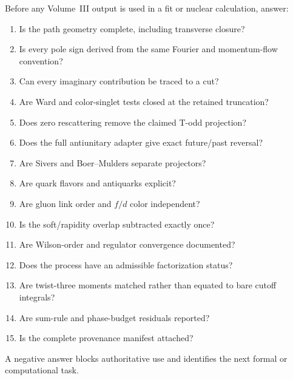 \documentclass[11pt]{article}
\begin{document}
Before any Volume~III output is used in a fit or nuclear calculation, answer:
\begin{enumerate}
\item Is the path geometry complete, including transverse closure?
\item Is every pole sign derived from the same Fourier and momentum-flow
      convention?
\item Can every imaginary contribution be traced to a cut?
\item Are Ward and color-singlet tests closed at the retained truncation?
\item Does zero rescattering remove the claimed T-odd projection?
\item Does the full antiunitary adapter give exact future/past reversal?
\item Are Sivers and Boer--Mulders separate projectors?
\item Are quark flavors and antiquarks explicit?
\item Are gluon link order and \(f/d\) color independent?
\item Is the soft/rapidity overlap subtracted exactly once?
\item Are Wilson-order and regulator convergence documented?
\item Does the process have an admissible factorization status?
\item Are twist-three moments matched rather than equated to bare cutoff
      integrals?
\item Are sum-rule and phase-budget residuals reported?
\item Is the complete provenance manifest attached?
\end{enumerate}
A negative answer blocks authoritative use and identifies the next formal or
computational task.
\end{document}
